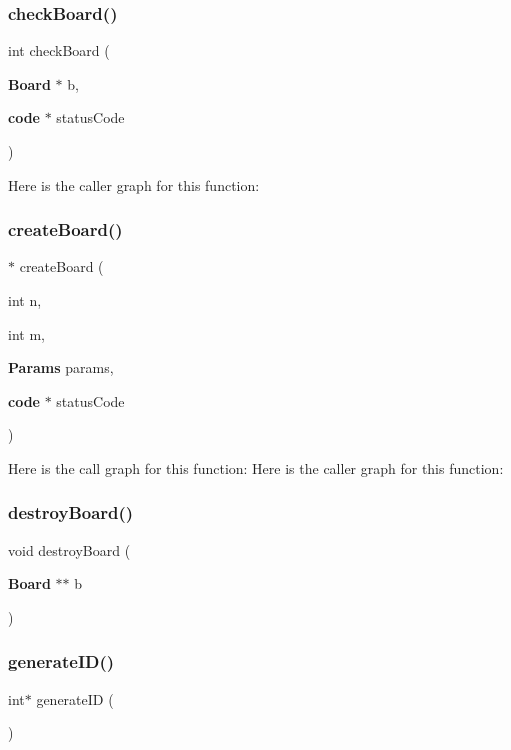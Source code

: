 \subsubsection{check\+Board()}
{\footnotesize\ttfamily int check\+Board (\begin{DoxyParamCaption}\item[{{\bf Board} $\ast$}]{b,  }\item[{{\bf code} $\ast$}]{status\+Code }\end{DoxyParamCaption})}

Here is the caller graph for this function\+:
\label{funciones_8c_aa971770733231651e7c3e68530aa5563} 
\subsubsection{create\+Board()}
{\footnotesize{}$\ast$ create\+Board (\begin{DoxyParamCaption}\item[{int}]{n,  }\item[{int}]{m,  }\item[{{\bf Params}}]{params,  }\item[{{\bf code} $\ast$}]{status\+Code }\end{DoxyParamCaption})}

Here is the call graph for this function\+:
Here is the caller graph for this function\+:
\label{funciones_8c_a87582dd6476bdbcd4c9dab6c371a0ef9} 
\subsubsection{destroy\+Board()}
{\footnotesize\ttfamily void destroy\+Board (\begin{DoxyParamCaption}\item[{{\bf Board} $\ast$$\ast$}]{b }\end{DoxyParamCaption})}

\label{funciones_8c_a76eb46ff45a6b9a08d6e52d92302cce9} 
\subsubsection{generate\+I\+D()}
{\footnotesize\ttfamily int$\ast$ generate\+ID (\begin{DoxyParamCaption}{ }\end{DoxyParamCaption})}

